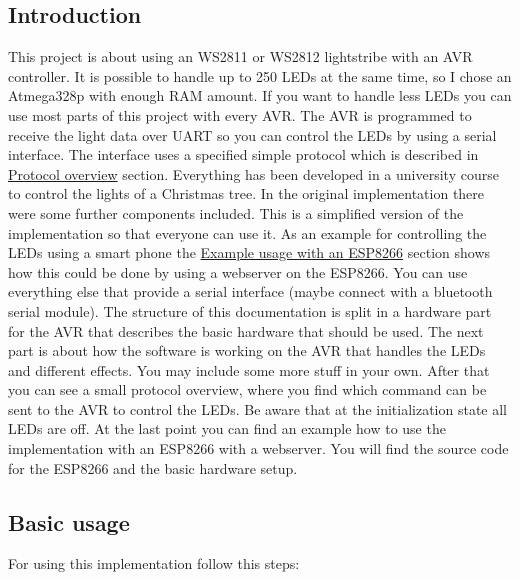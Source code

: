  \hypertarget{index_intro_sec}{}\subsection{Introduction}\label{index_intro_sec}
This project is about using an W\+S2811 or W\+S2812 lightstribe with an A\+V\+R controller. It is possible to handle up to 250 L\+E\+Ds at the same time, so I chose an Atmega328p with enough R\+A\+M amount. If you want to handle less L\+E\+Ds you can use most parts of this project with every A\+V\+R. The A\+V\+R is programmed to receive the light data over U\+A\+R\+T so you can control the L\+E\+Ds by using a serial interface. The interface uses a specified simple protocol which is described in \hyperlink{index_protocol_sec}{Protocol overview} section. Everything has been developed in a university course to control the lights of a Christmas tree. In the original implementation there were some further components included. This is a simplified version of the implementation so that everyone can use it. As an example for controlling the L\+E\+Ds using a smart phone the \hyperlink{index_esp_sec}{Example usage with an E\+S\+P8266} section shows how this could be done by using a webserver on the E\+S\+P8266. You can use everything else that provide a serial interface (maybe connect with a bluetooth serial module). The structure of this documentation is split in a hardware part for the A\+V\+R that describes the basic hardware that should be used. The next part is about how the software is working on the A\+V\+R that handles the L\+E\+Ds and different effects. You may include some more stuff in your own. After that you can see a small protocol overview, where you find which command can be sent to the A\+V\+R to control the L\+E\+Ds. Be aware that at the initialization state all L\+E\+Ds are off. At the last point you can find an example how to use the implementation with an E\+S\+P8266 with a webserver. You will find the source code for the E\+S\+P8266 and the basic hardware setup.\hypertarget{index_usage_sec}{}\subsection{Basic usage}\label{index_usage_sec}
For using this implementation follow this steps\+: 
